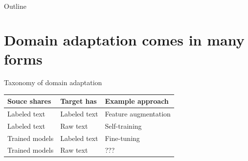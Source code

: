 \documentclass[14pt]{beamer}
\begin{document}
\begin{frame}{Outline}
    \tableofcontents
\end{frame}


\section{Domain adaptation comes in many forms}

\begin{frame}{Taxonomy of domain adaptation}
\begin{tabular}{ l l l }
\toprule
Souce shares & Target has & Example approach \\
\midrule
\pause
Labeled text & Labeled text & Feature augmentation \\
\pause
Labeled text & Raw text & Self-training \\
\pause
Trained models & Labeled text & Fine-tuning \\
\pause
Trained models & Raw text & ??? \\
\bottomrule
\end{tabular}
\end{frame}
\end{document}
